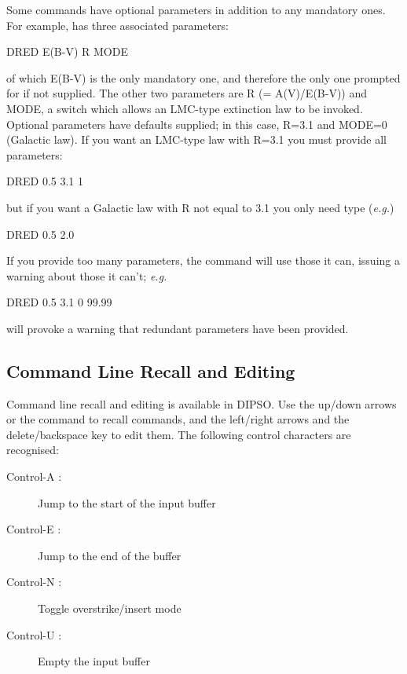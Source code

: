 \documentclass[twoside,11pt,noabs,nolof]{starlink}
\newenvironment{dipdesc}{\begin{description}}{\end{description}}
\providecommand{\dipitem}[2]{ \item[{#1}] {#2} }
\begin{document}
Some commands have optional parameters in addition to any mandatory
ones. For example,   has three associated parameters:

\begin{terminalv}
DRED E(B-V) R MODE
\end{terminalv}

of which E(B-V) is the only mandatory one, and therefore the only one
prompted for if not supplied. The other two parameters are R (=
A(V)/E(B-V)) and MODE, a switch which allows an LMC-type extinction
law to be invoked. Optional parameters have defaults supplied; in this
case, R=3.1 and MODE=0 (Galactic law). If you want an LMC-type law
with R=3.1 you must provide all parameters:

\begin{terminalv}
DRED 0.5 3.1 1
\end{terminalv}

but if you want a Galactic law with R not equal to 3.1 you only need
type (\emph{e.g.})

\begin{terminalv}
DRED 0.5 2.0
\end{terminalv}

If you provide too many parameters, the command will use those it can,
issuing a warning about those it can't; \emph{e.g.}

\begin{terminalv}
DRED 0.5 3.1 0 99.99
\end{terminalv}

will provoke a warning that redundant parameters have been provided.

\subsection{Command Line Recall and Editing}
Command line recall and editing is available in DIPSO. Use the up/down
arrows or the   command to recall commands, and the left/right
arrows and the delete/backspace key to edit them. The following control
characters are recognised:

\begin{dipdesc}
\dipitem {Control-A :}{ Jump to the start of the input buffer }
\dipitem {Control-E :}{ Jump to the end of the buffer }
\dipitem {Control-N :}{ Toggle overstrike/insert mode }
\dipitem {Control-U :}{ Empty the input buffer}
\end{dipdesc}
\end{document}
